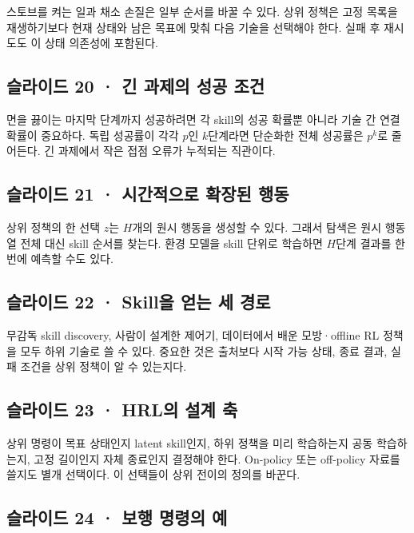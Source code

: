 \documentclass[11pt,a4paper]{article}
\begin{document}
스토브를 켜는 일과 채소 손질은 일부 순서를 바꿀 수 있다. 상위 정책은 고정 목록을 재생하기보다 현재 상태와 남은 목표에 맞춰 다음 기술을 선택해야 한다. 실패 후 재시도도 이 상태 의존성에 포함된다.\par

\subsection{슬라이드 20 · 긴 과제의 성공 조건}

면을 끓이는 마지막 단계까지 성공하려면 각 skill의 성공 확률뿐 아니라 기술 간 연결 확률이 중요하다. 독립 성공률이 각각 $p$인 $k$단계라면 단순화한 전체 성공률은 $p^k$로 줄어든다. 긴 과제에서 작은 접점 오류가 누적되는 직관이다.\par

\subsection{슬라이드 21 · 시간적으로 확장된 행동}

상위 정책의 한 선택 $z$는 $H$개의 원시 행동을 생성할 수 있다. 그래서 탐색은 원시 행동열 전체 대신 skill 순서를 찾는다. 환경 모델을 skill 단위로 학습하면 $H$단계 결과를 한 번에 예측할 수도 있다.\par

\subsection{슬라이드 22 · Skill을 얻는 세 경로}

무감독 skill discovery, 사람이 설계한 제어기, 데이터에서 배운 모방·offline RL 정책을 모두 하위 기술로 쓸 수 있다. 중요한 것은 출처보다 시작 가능 상태, 종료 결과, 실패 조건을 상위 정책이 알 수 있는지다.\par

\subsection{슬라이드 23 · HRL의 설계 축}

상위 명령이 목표 상태인지 latent skill인지, 하위 정책을 미리 학습하는지 공동 학습하는지, 고정 길이인지 자체 종료인지 결정해야 한다. On-policy 또는 off-policy 자료를 쓸지도 별개 선택이다. 이 선택들이 상위 전이의 정의를 바꾼다.\par

\subsection{슬라이드 24 · 보행 명령의 예}
\end{document}

